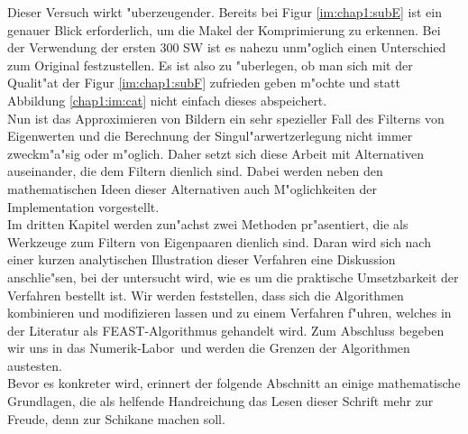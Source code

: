 Dieser Versuch wirkt "uberzeugender. Bereits bei Figur \ref{im:chap1:subE} ist ein genauer Blick erforderlich, um die Makel der Komprimierung zu erkennen.
Bei der Verwendung der ersten 300 SW ist es nahezu unm"oglich einen Unterschied zum Original festzustellen.
Es ist also zu "uberlegen, ob man sich mit der Qualit"at der Figur \ref{im:chap1:subF} zufrieden geben m"ochte und statt Abbildung \ref{chap1:im:cat} nicht einfach dieses abspeichert.\\

Nun ist das Approximieren von Bildern ein sehr spezieller Fall des Filterns von Eigenwerten und die Berechnung der Singul"arwertzerlegung nicht immer zweckm"a"sig oder m"oglich.
Daher setzt sich diese Arbeit mit Alternativen auseinander, die dem Filtern dienlich sind. Dabei werden neben den mathematischen Ideen dieser Alternativen auch M"oglichkeiten der Implementation vorgestellt.\\

Im dritten Kapitel werden zun"achst zwei Methoden pr"asentiert, die als Werkzeuge zum Filtern von Eigenpaaren dienlich sind.
Daran wird sich nach einer kurzen analytischen Illustration dieser Verfahren eine Diskussion anschlie"sen, bei der untersucht wird, wie es um die praktische Umsetzbarkeit der Verfahren bestellt ist.
Wir werden feststellen, dass sich die Algorithmen kombinieren und modifizieren lassen und zu einem Verfahren f"uhren, welches in der Literatur als FEAST-Algorithmus gehandelt wird. Zum Abschluss begeben wir uns in das \glqq Numerik-Labor\grqq\ und werden die Grenzen der Algorithmen austesten.\\

Bevor es konkreter wird, erinnert der folgende Abschnitt an einige mathematische Grundlagen, die als helfende Handreichung das Lesen dieser Schrift mehr zur Freude, denn zur Schikane machen soll.
